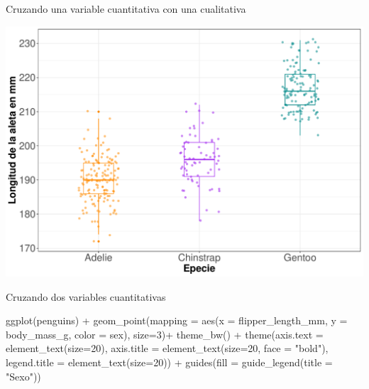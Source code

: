 \documentclass[
  ignorenonframetext,
  aspectratio=169]{beamer}
\newenvironment{Shaded}{\begin{snugshade}}{\end{snugshade}}
\newcommand{\AttributeTok}[1]{\textcolor[rgb]{0.77,0.63,0.00}{#1}}
\newcommand{\DecValTok}[1]{\textcolor[rgb]{0.00,0.00,0.81}{#1}}
\newcommand{\FunctionTok}[1]{\textcolor[rgb]{0.00,0.00,0.00}{#1}}
\newcommand{\NormalTok}[1]{#1}
\newcommand{\SpecialCharTok}[1]{\textcolor[rgb]{0.00,0.00,0.00}{#1}}
\newcommand{\StringTok}[1]{\textcolor[rgb]{0.31,0.60,0.02}{#1}}
\begin{document}
\begin{frame}{Cruzando una variable cuantitativa con una cualitativa}
\protect\hypertarget{cruzando-una-variable-cuantitativa-con-una-cualitativa-4}{}
\begin{center}\includegraphics[width=0.6\linewidth,height=0.5\textheight]{tidyverse_AD_files/figure-beamer/unnamed-chunk-137-1} \end{center}
\end{frame}

\begin{frame}[fragile]{Cruzando dos variables cuantitativas}
\protect\hypertarget{cruzando-dos-variables-cuantitativas}{}
\begin{Shaded}
\begin{Highlighting}[]
\FunctionTok{ggplot}\NormalTok{(penguins) }\SpecialCharTok{+}
  \FunctionTok{geom\_point}\NormalTok{(}\AttributeTok{mapping =} \FunctionTok{aes}\NormalTok{(}\AttributeTok{x =}\NormalTok{ flipper\_length\_mm,}
                           \AttributeTok{y =}\NormalTok{ body\_mass\_g,}
                           \AttributeTok{color =}\NormalTok{ sex), }\AttributeTok{size=}\DecValTok{3}\NormalTok{)}\SpecialCharTok{+} \FunctionTok{theme\_bw}\NormalTok{() }\SpecialCharTok{+}
  \FunctionTok{theme}\NormalTok{(}\AttributeTok{axis.text =} \FunctionTok{element\_text}\NormalTok{(}\AttributeTok{size=}\DecValTok{20}\NormalTok{),}
        \AttributeTok{axis.title =} \FunctionTok{element\_text}\NormalTok{(}\AttributeTok{size=}\DecValTok{20}\NormalTok{, }\AttributeTok{face =} \StringTok{"bold"}\NormalTok{),}
        \AttributeTok{legend.title =} \FunctionTok{element\_text}\NormalTok{(}\AttributeTok{size=}\DecValTok{20}\NormalTok{)) }\SpecialCharTok{+} 
  \FunctionTok{guides}\NormalTok{(}\AttributeTok{fill =} \FunctionTok{guide\_legend}\NormalTok{(}\AttributeTok{title =} \StringTok{"Sexo"}\NormalTok{))}
\end{Highlighting}
\end{Shaded}
\end{frame}
\end{document}
